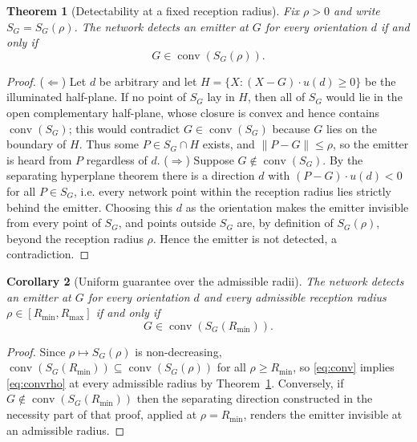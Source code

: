 \documentclass[preprint,12pt,3p]{elsarticle}
\newtheorem{theorem}{Theorem}
\newtheorem{corollary}[theorem]{Corollary}
\theoremstyle{definition}
\newcommand{\conv}{\operatorname{conv}}
\newcommand{\Rmin}{R_{\min}}
\newcommand{\Rmax}{R_{\max}}
\begin{document}
\begin{theorem}[Detectability at a fixed reception radius]
\label{thm:detect}
Fix $\rho>0$ and write $S_G=S_G(\rho)$. The network detects an emitter at $G$ for \emph{every}
orientation $d$ if and only if
\begin{equation}
G\in\conv(S_G(\rho)).
\label{eq:convrho}
\end{equation}
\end{theorem}
\begin{proof}
($\Leftarrow$) Let $d$ be arbitrary and let $H=\{X:(X-G)\cdot u(d)\ge0\}$ be the illuminated
half-plane. If no point of $S_G$ lay in $H$, then all of $S_G$ would lie in the open complementary
half-plane, whose closure is convex and hence contains $\conv(S_G)$; this would contradict
$G\in\conv(S_G)$ because $G$ lies on the boundary of $H$. Thus some $P\in S_G\cap H$ exists, and
$\|P-G\|\le\rho$, so the emitter is heard from $P$ regardless of $d$.
($\Rightarrow$) Suppose $G\notin\conv(S_G)$. By the separating hyperplane theorem there is a
direction $d$ with $(P-G)\cdot u(d)<0$ for all $P\in S_G$, i.e. every network point within the
reception radius lies strictly behind the emitter. Choosing this $d$ as the orientation makes the
emitter invisible from every point of $S_G$, and points outside $S_G$ are, by definition of
$S_G(\rho)$, beyond the reception radius $\rho$. Hence the emitter is not detected, a
contradiction.
\end{proof}

\begin{corollary}[Uniform guarantee over the admissible radii]
\label{cor:uniform}
The network detects an emitter at $G$ for every orientation $d$ \emph{and every} admissible
reception radius $\rho\in[\Rmin,\Rmax]$ if and only if
\begin{equation}
G\in\conv(S_G(\Rmin)).
\label{eq:conv}
\end{equation}
\end{corollary}
\begin{proof}
Since $\rho\mapsto S_G(\rho)$ is non-decreasing, $\conv(S_G(\Rmin))\subseteq\conv(S_G(\rho))$ for
all $\rho\ge\Rmin$, so \eqref{eq:conv} implies \eqref{eq:convrho} at every admissible radius by
Theorem~\ref{thm:detect}. Conversely, if $G\notin\conv(S_G(\Rmin))$ then the separating direction
constructed in the necessity part of that proof, applied at $\rho=\Rmin$, renders the emitter
invisible at an admissible radius.
\end{proof}
\end{document}
